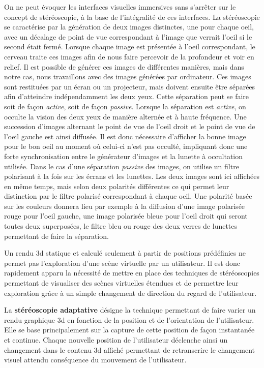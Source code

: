 On ne peut évoquer les interfaces visuelles immersives sans s'arrêter sur le concept de stéréoscopie, à la base de l'intégralité de ces interfaces. La stéréoscopie se caractérise par la génération de deux images distinctes, une pour chaque oeil, avec un décalage de point de vue correspondant à l'image que verrait l'oeil si le second était fermé. Lorsque chaque image est présentée à l'oeil correspondant, le cerveau traite ces images afin de nous faire percevoir de la profondeur et voir en relief. Il est possible de générer ces images de différentes manières, mais dans notre cas, nous travaillons avec des images générées par ordinateur. Ces images sont restituées par un écran ou un projecteur, mais doivent ensuite être séparées afin d'atteindre indépendamment les deux yeux. Cette séparation peut se faire soit de façon \textit{active}, soit de façon \textit{passive}. Lorsque la séparation est \textit{active}, on occulte la vision des deux yeux de manière alternée et à haute fréquence. Une succession d'images alternant le point de vue de l'oeil droit et le point de vue de l'oeil gauche est ainsi diffusée. Il est donc nécessaire d'afficher la bonne image pour le bon oeil au moment où celui-ci n'est pas occulté, impliquant donc une forte synchronisation entre le générateur d'images et la lunette à occultation utilisée.
Dans le cas d'une séparation \textit{passive} des images, on utilise un filtre polarisant à la fois sur les écrans et les lunettes. Les deux images sont ici affichées en même temps, mais selon deux polarités différentes ce qui permet leur distinction par le filtre polarisé correspondant à chaque oeil. Une polarité basée sur les couleurs donnera lieu par exemple à la diffusion d'une image polarisée rouge pour l'oeil gauche, une image polarisée bleue pour l'oeil droit qui seront toutes deux superposées, le filtre bleu ou rouge des deux verres de lunettes permettant de faire la séparation.

 \label{visu_adaptative}

Un rendu 3d statique et calculé seulement à partir de positions prédéfinies ne permet pas l'exploration d'une scène virtuelle par un utilisateur. Il est donc rapidement apparu la nécessité de mettre en place des techniques de stéréoscopies permettant de visualiser des scènes virtuelles étendues et de permettre leur exploration grâce à un simple changement de direction du regard de l'utilisateur.

La \textbf{stéréoscopie adaptative} désigne la technique permettant de faire varier un rendu graphique 3d en fonction de la position et de l'orientation de l'utilisateur. Elle se base principalement sur la capture de cette position de façon instantanée et continue. Chaque nouvelle position de l'utilisateur déclenche ainsi un changement dans le contenu 3d affiché permettant de retranscrire le changement visuel attendu conséquence du mouvement de l'utilisateur.

